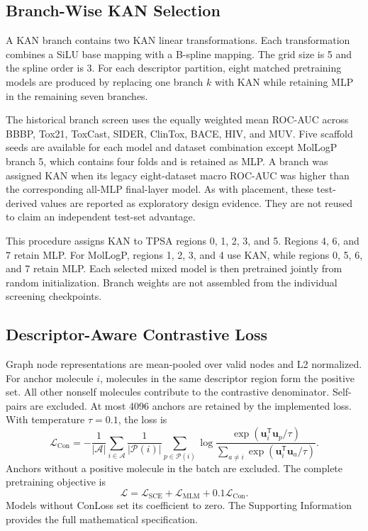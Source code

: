 \documentclass[journal=jcisd8,manuscript=article]{achemso}
\begin{document}
\subsection{Branch-Wise KAN Selection}

A KAN branch contains two KAN linear transformations. Each transformation combines a SiLU base mapping with a B-spline mapping. The grid size is 5 and the spline order is 3. For each descriptor partition, eight matched pretraining models are produced by replacing one branch \(k\) with KAN while retaining MLP in the remaining seven branches.

The historical branch screen uses the equally weighted mean ROC-AUC across
BBBP, Tox21, ToxCast, SIDER, ClinTox, BACE, HIV, and MUV. Five scaffold seeds
are available for each model and dataset combination except MolLogP branch 5,
which contains four folds and is retained as MLP. A branch was assigned KAN
when its legacy eight-dataset macro ROC-AUC was higher than the corresponding
all-MLP final-layer model. As with placement, these test-derived values are
reported as exploratory design evidence. They are not reused to claim an
independent test-set advantage.

This procedure assigns KAN to TPSA regions 0, 1, 2, 3, and 5. Regions 4, 6, and 7 retain MLP. For MolLogP, regions 1, 2, 3, and 4 use KAN, while regions 0, 5, 6, and 7 retain MLP. Each selected mixed model is then pretrained jointly from random initialization. Branch weights are not assembled from the individual screening checkpoints.

\subsection{Descriptor-Aware Contrastive Loss}

Graph node representations are mean-pooled over valid nodes and L2 normalized. For anchor molecule \(i\), molecules in the same descriptor region form the positive set. All other nonself molecules contribute to the contrastive denominator. Self-pairs are excluded. At most 4096 anchors are retained by the implemented loss. With temperature \(\tau=0.1\), the loss is
\begin{equation}
\mathcal{L}_{\mathrm{Con}}
=
-\frac{1}{|\mathcal{A}|}
\sum_{i\in\mathcal{A}}
\frac{1}{|\mathcal{P}(i)|}
\sum_{p\in\mathcal{P}(i)}
\log
\frac{
\exp\left(\mathbf{u}_i^{\mathsf{T}}\mathbf{u}_p/\tau\right)
}{
\sum_{a\neq i}
\exp\left(\mathbf{u}_i^{\mathsf{T}}\mathbf{u}_a/\tau\right)
}.
\end{equation}
Anchors without a positive molecule in the batch are excluded. The complete pretraining objective is
\begin{equation}
\mathcal{L}
=
\mathcal{L}_{\mathrm{SCE}}
+
\mathcal{L}_{\mathrm{MLM}}
+
0.1\mathcal{L}_{\mathrm{Con}}.
\end{equation}
Models without ConLoss set its coefficient to zero. The Supporting Information provides the full mathematical specification.
\end{document}
